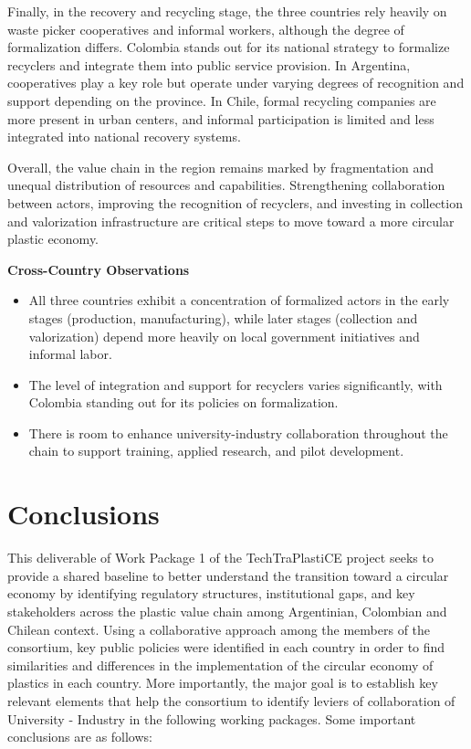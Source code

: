 \documentclass[
  12pt,
  oneside]{book}
\providecommand{\tightlist}{%
  \setlength{\itemsep}{0pt}\setlength{\parskip}{0pt}}
\begin{document}
Finally, in the recovery and recycling stage, the three countries rely
heavily on waste picker cooperatives and informal workers, although the
degree of formalization differs. Colombia stands out for its national
strategy to formalize recyclers and integrate them into public service
provision. In Argentina, cooperatives play a key role but operate under
varying degrees of recognition and support depending on the province. In
Chile, formal recycling companies are more present in urban centers, and
informal participation is limited and less integrated into national
recovery systems.

Overall, the value chain in the region remains marked by fragmentation
and unequal distribution of resources and capabilities. Strengthening
collaboration between actors, improving the recognition of recyclers,
and investing in collection and valorization infrastructure are critical
steps to move toward a more circular plastic economy.

\textbf{Cross-Country Observations}

\begin{itemize}
\tightlist
\item
  All three countries exhibit a concentration of formalized actors in
  the early stages (production, manufacturing), while later stages
  (collection and valorization) depend more heavily on local government
  initiatives and informal labor.
\item
  The level of integration and support for recyclers varies
  significantly, with Colombia standing out for its policies on
  formalization.
\item
  There is room to enhance university-industry collaboration throughout
  the chain to support training, applied research, and pilot
  development.
\end{itemize}

\chapter{Conclusions}\label{conclusions}

This deliverable of Work Package 1 of the TechTraPlastiCE project seeks
to provide a shared baseline to better understand the transition toward
a circular economy by identifying regulatory structures, institutional
gaps, and key stakeholders across the plastic value chain among
Argentinian, Colombian and Chilean context. Using a collaborative
approach among the members of the consortium, key public policies were
identified in each country in order to find similarities and differences
in the implementation of the circular economy of plastics in each
country. More importantly, the major goal is to establish key relevant
elements that help the consortium to identify leviers of collaboration
of University - Industry in the following working packages. Some
important conclusions are as follows:
\end{document}
